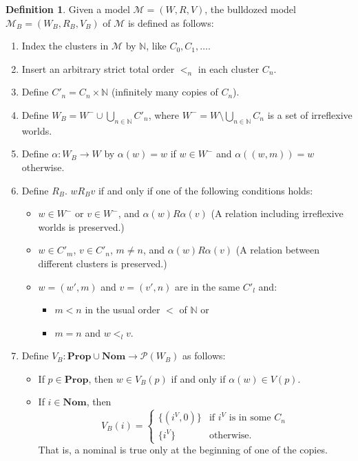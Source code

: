 \documentclass{article}
\theoremstyle{definition}
\newtheorem{definition}{Definition}[section]
\newcommand{\Prop}{\mathbf{Prop}}
\newcommand{\Nom}{\mathbf{Nom}}
\newcommand{\Kmodel}{\mathcal{M}}
\begin{document}
\begin{definition}
    Given a model $\Kmodel = (W, R, V)$, the bulldozed model $\Kmodel_B = (W_B, R_B, V_B)$ of $\Kmodel$ is defined as follows:
    \begin{enumerate}[1.]
        \item Index the clusters in $\Kmodel$ by $\mathbb{N}$, like $C_0, C_1, \ldots$.
        \item Insert an arbitrary strict total order $<_n$ in each cluster $C_n$.
        \item Define $C'_n = C_n \times \mathbb{N}$ (infinitely many copies of $C_n$).
        \item Define $W_B = W^- \cup \bigcup_{n \in \mathbb{N}} C'_n$, where $W^- = W \setminus \bigcup_{n \in \mathbb{N}} C_n$ is a set of irreflexive worlds.
        \item Define $\alpha: W_B \rightarrow W$ by $\alpha(w) = w$ if $w \in W^-$ and $\alpha((w, m)) = w$ otherwise.
        \item Define $R_B$. $w R_B v$ if and only if one of the following conditions holds:
        \begin{itemize}
            \item $w \in W^-$ or $v \in W^-$, and $\alpha(w) R \alpha(v)$ (A relation including irreflexive worlds is preserved.)
            \item $w \in C'_m$, $v \in C'_n$, $m \neq n$, and $\alpha(w) R \alpha(v)$ (A relation between different clusters is preserved.)
            \item $w = (w', m)$ and $v = (v', n)$ are in the same $C'_l$ and: 
            \begin{itemize}
                \item $m < n$ in the usual order $<$ of $\mathbb{N}$ or
                \item $m = n$ and $w <_l v$.
            \end{itemize}
        \end{itemize}
        \item Define $V_B: \Prop \cup \Nom \rightarrow \mathcal{P}(W_B)$ as follows:
        \begin{itemize}
            \item If $p \in \Prop$, then $w \in V_B(p)$ if and only if $\alpha(w) \in V(p)$.
            \item If $i \in \Nom$, then
            \[
                V_B(i) =
                \begin{cases}
                    \{ (i^V, 0) \} &\text{if } i^V \text{ is in some } C_n \\
                    \{ i^V \} &\text{otherwise}.
                \end{cases}
            \]
            That is, a nominal is true only at the beginning of one of the copies.
        \end{itemize}
    \end{enumerate}
    \label{defbulldoze}
\end{definition}
\end{document}
